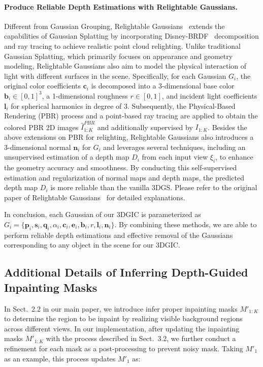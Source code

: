 \paragraph{Produce Reliable Depth Estimations with Relightable Gaussians.}
Different from Gaussian Grouping, Relightable Gaussians~\cite{gao2023relightable} extends the capabilities of Gaussian Splatting by incorporating Disney-BRDF~\cite{burley2012brdf} decomposition and ray tracing to achieve realistic point cloud relighting. 
Unlike traditional Gaussian Splatting, which primarily focuses on appearance and geometry modeling, Relightable Gaussians also aim to model the physical interaction of light with different surfaces in the scene.
Specifically, for each Gaussian $G_i$, the original color coefficients $\mathbf{c}_i$ is decomposed into a 3-dimensional base color $\mathbf{b}_i \in [0,1]^3$, a 1-dimensional roughness $r \in [0,1]$, and incident light coefficients $\mathbf{l}_i$ for spherical harmonics in degree of 3. Subsequently, the Physical-Based Rendering (PBR) process and a point-based ray tracing are applied to obtain the colored PBR 2D images $\hat{I}^{PBR}_{1:K}$ and additionally supervised by $I_{1:K}$. Besides the above extensions on PBR for relighting, Relightable Gaussians also introduces a 3-dimensional normal $\mathbf{n}_i$ for $G_i$ and leverages several techniques, including an unsupervised estimation of a depth map $D_i$ from each input view $\xi_i$, to enhance the geometry accuracy and smoothness. By conducting this self-supervised estimation and regularization of normal maps and depth maps, the predicted depth map $D_i$ is more reliable than the vanilla 3DGS. Please refer to the original paper of Relightable Gaussians~\cite{gao2023relightable} for detailed explanations.  

In conclusion, each Gaussian of our 3DGIC is parameterized as $G_i = \{\mathbf{p}_i, \mathbf{s}_i, \mathbf{q}_i, {\alpha}_i, \mathbf{c}_i, \mathbf{e}_i, \mathbf{b}_i, r,  \mathbf{l}_i, \mathbf{n}_i\}$. By combining these methods, we are able to perform reliable depth estimations and effective removal of the Gaussians corresponding to any object in the scene for our 3DGIC.



\subsection{Additional Details of  Inferring Depth-Guided Inpainting Masks}
In Sect.~\textcolor{cvprblue}{2.2} in our main paper, we introduce infer proper inpainting masks $M'_{1:K}$ to determine the region to be inpaint by realizing visible background regions across different views. In our implementation, after updating the inpainting masks $M'_{1:K}$ with the process described in Sect.~\textcolor{cvprblue}{3.2}, we further conduct a refinement for each mask as a post-processing to prevent noisy mask. Taking $M'_1$ as an example, this process updates $M'_1$ as:

